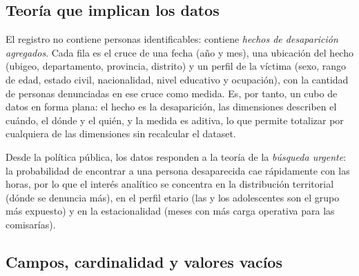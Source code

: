 \subsection{Teor\'ia que implican los datos}
El registro no contiene personas identificables: contiene \emph{hechos de desaparici\'on
agregados}. Cada fila es el cruce de una fecha (a\~no y mes), una ubicaci\'on del hecho (ubigeo,
departamento, provincia, distrito) y un perfil de la v\'ictima (sexo, rango de edad, estado
civil, nacionalidad, nivel educativo y ocupaci\'on), con la cantidad de personas denunciadas en
ese cruce como medida. Es, por tanto, un cubo de datos en forma plana: el hecho es la
desaparici\'on, las dimensiones describen el cu\'ando, el d\'onde y el qui\'en, y la medida es
aditiva, lo que permite totalizar por cualquiera de las dimensiones sin recalcular el dataset.

Desde la pol\'itica p\'ublica, los datos responden a la teor\'ia de la \emph{b\'usqueda urgente}:
la probabilidad de encontrar a una persona desaparecida cae r\'apidamente con las horas, por lo
que el inter\'es anal\'itico se concentra en la distribuci\'on territorial (d\'onde se denuncia
m\'as), en el perfil etario (las y los adolescentes son el grupo m\'as expuesto) y en la
estacionalidad (meses con m\'as carga operativa para las comisar\'ias).

\subsection{Campos, cardinalidad y valores vac\'ios}

